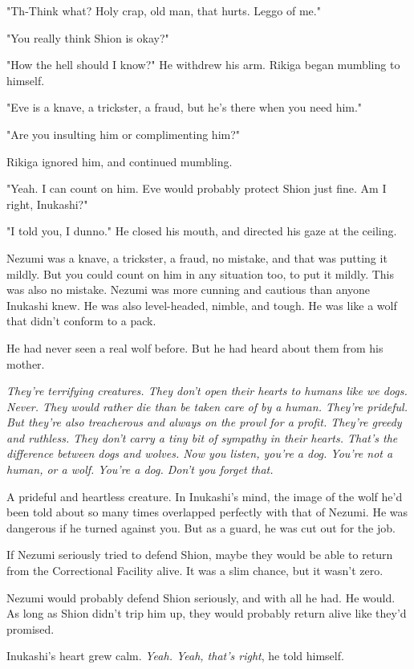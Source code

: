 "Th-Think what? Holy crap, old man, that hurts. Leggo of me."

"You really think Shion is okay?"

"How the hell should I know?" He withdrew his arm. Rikiga began mumbling
to himself.

"Eve is a knave, a trickster, a fraud, but he's there when you need
him."

"Are you insulting him or complimenting him?"

Rikiga ignored him, and continued mumbling.

"Yeah. I can count on him. Eve would probably protect Shion just fine.
Am I right, Inukashi?"

"I told you, I dunno." He closed his mouth, and directed his gaze at the
ceiling.

Nezumi was a knave, a trickster, a fraud, no mistake, and that was
putting it mildly. But you could count on him in any situation too, to
put it mildly. This was also no mistake. Nezumi was more cunning and
cautious than anyone Inukashi knew. He was also level-headed, nimble,
and tough. He was like a wolf that didn't conform to a pack.

He had never seen a real wolf before. But he had heard about them from
his mother.

\emph{They're terrifying creatures. They don't open their hearts to humans
like we dogs. Never. They would rather die than be taken care of by a
human. They're prideful. But they're also treacherous and always on the
prowl for a profit. They're greedy and ruthless. They don't carry a tiny
bit of sympathy in their hearts. That's the difference between dogs and
wolves. Now you listen, you're a dog. You're not a human, or a wolf.
You're a dog. Don't you forget that.}

A prideful and heartless creature. In Inukashi's mind, the image of the
wolf he'd been told about so many times overlapped perfectly with that
of Nezumi. He was dangerous if he turned against you. But as a guard, he
was cut out for the job.

If Nezumi seriously tried to defend Shion, maybe they would be able to
return from the Correctional Facility alive. It was a slim chance, but
it wasn't zero.

Nezumi would probably defend Shion seriously, and with all he had. He
would. As long as Shion didn't trip him up, they would probably return
alive like they'd promised.

Inukashi's heart grew calm. \emph{Yeah. Yeah, that's right}, he told himself.

